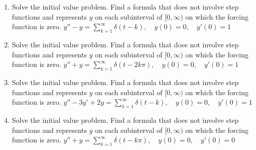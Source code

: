 \documentclass{ximera}
\begin{document}
\begin{problem}\label{exer:8.7.30}
\begin{enumerate}

\item Solve the initial value problem. Find a formula that
does not involve step functions and represents $y$  on each subinterval of $[0,\infty)$ on which the forcing function is zero.
$y''-y=\sum_{k=1}^\infty\delta(t-k), \quad  y(0)=0,\quad y'(0)=1$

\item Solve the initial value problem. Find a formula that
does not involve step functions and represents $y$  on each subinterval of $[0,\infty)$ on which the forcing function is zero.
$y''+y=\sum_{k=1}^\infty\delta(t-2k\pi), \quad  y(0)=0,\quad y'(0)=1$

\item Solve the initial value problem. Find a formula that
does not involve step functions and represents $y$  on each subinterval of $[0,\infty)$ on which the forcing function is zero.
$y''-3y'+2y=\sum_{k=1}^\infty\delta(t-k), \quad  y(0)=0,\quad y'(0)=1$

\item Solve the initial value problem. Find a formula that
does not involve step functions and represents $y$  on each subinterval of $[0,\infty)$ on which the forcing function is zero.
$y''+y=\sum_{k=1}^\infty\delta(t-k\pi), \quad  y(0)=0,\quad y'(0)=0$
\end{enumerate}
\end{problem}
\end{document}
